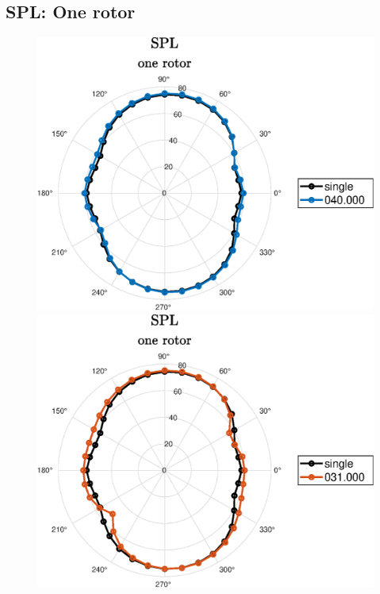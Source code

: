 \subsection{SPL: One rotor}
\begin{frame}{\subsecname}
    \begin{figure} [H]  
	\centering
	\subfloat
	{\includegraphics[scale=0.35]{Photos/spl_1rot_040000_single.eps}}
	\subfloat
	{\includegraphics[scale=0.35]{Photos/spl_1rot_031000_single.eps}
  }
\end{figure} 
\end{frame}

